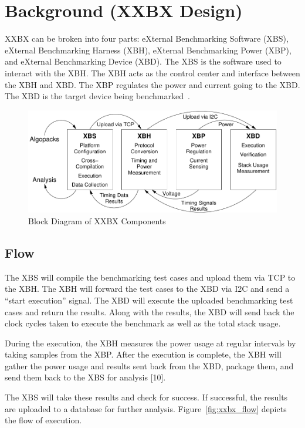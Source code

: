 \documentclass[10pt]{article}
\begin{document}
\section{Background (XXBX Design)}

XXBX can be broken into four parts: eXternal Benchmarking Software (XBS), eXternal 
Benchmarking Harness (XBH), eXternal Benchmarking Power (XBP), and 
eXternal Benchmarking Device (XBD). The XBS is the software used to interact with the XBH. 
The XBH acts as the control center and interface between the XBH and XBD. The XBP regulates 
the power and current going to the XBD. The XBD is the target device being benchmarked~\cite{xxbx}.

\begin{figure}[ht]
    \centering
    \includegraphics[scale=0.8]{../figures/xxbx_block.pdf}
    \caption{Block Diagram of XXBX Components}
    \label{fig:xxbx_block}
\end{figure}

\subsection{Flow}
The XBS will compile the benchmarking test cases and upload them via TCP to the XBH. 
The XBH will forward the test cases to the XBD via I2C and send a ``start execution'' signal. 
The XBD will execute the uploaded benchmarking test cases and return the results. 
Along with the results, the XBD will send back the clock cycles taken to execute the 
benchmark as well as the total stack usage.

During the execution, the XBH measures the power usage at regular intervals by taking 
samples from the XBP. After the execution is complete, the XBH will gather the power 
usage and results sent back from the XBD, package them, and send them back to the XBS 
for analysis [10].

The XBS will take these results and check for success. If successful, the results are 
uploaded to a database for further analysis. Figure~\ref{fig:xxbx_flow} depicts the flow of execution.
\end{document}
